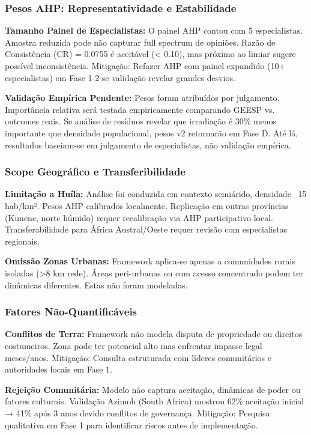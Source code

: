 \documentclass[12pt, a4paper]{article}
\begin{document}
\subsubsection{Pesos AHP: Representatividade e Estabilidade}

\textbf{Tamanho Painel de Especialistas:} O painel AHP contou com 5 especialistas. Amostra reduzida pode não capturar full spectrum de opiniões. Razão de Consistência (CR) = 0.0755 é aceitável (< 0.10), mas próximo ao limiar sugere possível inconsistência. Mitigação: Refazer AHP com painel expandido (10+ especialistas) em Fase 1-2 se validação revelar grandes desvios.

\textbf{Validação Empírica Pendente:} Pesos foram atribuídos por julgamento. Importância relativa será testada empiricamente comparando GEESP vs. outcomes reais. Se análise de resíduos revelar que irradiação é 30\% menos importante que densidade populacional, pesos v2 retornarão em Fase D. Até lá, resultados baseiam-se em julgamento de especialistas, não validação empírica.

\subsubsection{Scope Geográfico e Transferibilidade}

\textbf{Limitação a Huíla:} Análise foi conduzida em contexto semiárido, densidade ~15 hab/km². Pesos AHP calibrados localmente. Replicação em outras províncias (Kunene, norte húmido) requer recalibração via AHP participativo local. Transferabilidade para África Austral/Oeste requer revisão com especialistas regionais.

\textbf{Omissão Zonas Urbanas:} Framework aplica-se apenas a comunidades rurais isoladas (>8 km rede). Áreas peri-urbanas ou com acesso concentrado podem ter dinâmicas diferentes. Estas não foram modeladas.

\subsubsection{Fatores Não-Quantificáveis}

\textbf{Conflitos de Terra:} Framework não modela disputa de propriedade ou direitos costumeiros. Zona pode ter potencial alto mas enfrentar impasse legal meses/anos. Mitigação: Consulta estruturada com líderes comunitários e autoridades locais em Fase 1.

\textbf{Rejeição Comunitária:} Modelo não captura aceitação, dinâmicas de poder ou fatores culturais. Validação Azimoh (South Africa) mostrou 62\% aceitação inicial → 41\% após 3 anos devido conflitos de governança. Mitigação: Pesquisa qualitativa em Fase 1 para identificar riscos antes de implementação.
\end{document}
